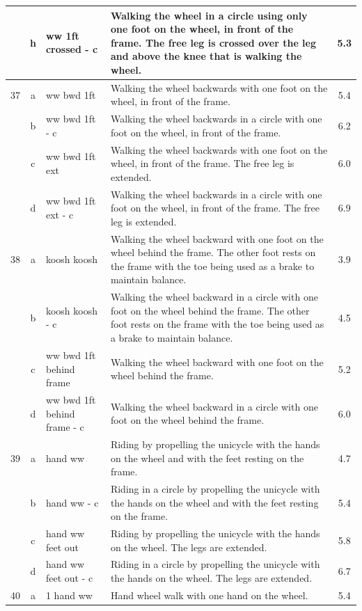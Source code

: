 \begin{longtable}{|r|c|p{4cm}|p{8cm}|c|}
\hline
  & h & ww 1ft crossed - c  & Walking the wheel in a circle using only one foot on the wheel, in front of the frame. The free leg is crossed over the leg and above the knee that is walking the wheel. & 5.3 \\ 
\hline
37  & a & ww bwd 1ft  & Walking the wheel backwards with one foot on the wheel, in front of the frame.  & 5.4 \\ 
\hline
  & b & ww bwd 1ft - c  & Walking the wheel backwards in a circle with one foot on the wheel, in front of the frame.  & 6.2 \\ 
\hline
  & c & ww bwd 1ft ext  & Walking the wheel backwards with one foot on the wheel, in front of the frame. The free leg is extended.  & 6.0 \\ 
\hline
  & d & ww bwd 1ft ext - c  & Walking the wheel backwards in a circle with one foot on the wheel, in front of the frame. The free leg is extended.  & 6.9 \\ 
\hline
38  & a & koosh koosh & Walking the wheel backward with one foot on the wheel behind the frame. The other foot rests on the frame with the toe being used as a brake to maintain balance. & 3.9 \\ 
\hline
  & b & koosh koosh - c & Walking the wheel backward in a circle with one foot on the wheel behind the frame. The other foot rests on the frame with the toe being used as a brake to maintain balance. & 4.5 \\ 
\hline
  & c & ww bwd 1ft behind frame & Walking the wheel backward with one foot on the wheel behind the frame. & 5.2 \\ 
\hline
  & d & ww bwd 1ft behind frame - c & Walking the wheel backward in a circle with one foot on the wheel behind the frame. & 6.0 \\ 
\hline
39  & a & hand ww & Riding by propelling the unicycle with the hands on the wheel and with the feet resting on the frame. & 4.7 \\ 
\hline
  & b & hand ww - c & Riding in a circle by propelling the unicycle with the hands on the wheel and with the feet resting on the frame. & 5.4 \\ 
\hline
  & c & hand ww feet out  & Riding by propelling the unicycle with the hands on the wheel. The legs are extended. & 5.8 \\ 
\hline
  & d & hand ww feet out - c  & Riding in a circle by propelling the unicycle with the hands on the wheel. The legs are extended. & 6.7 \\ 
\hline
40  & a & 1 hand ww & Hand wheel walk with one hand on the wheel. & 5.4 \\ 

\end{longtable}
